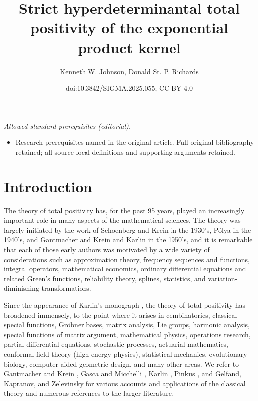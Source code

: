 \documentclass[10pt,a4paper]{amsart}
\title{Strict hyperdeterminantal total positivity of the exponential product kernel}
\author{Kenneth W. Johnson, Donald St. P. Richards}
\date{doi:10.3842/SIGMA.2025.055; CC BY 4.0}
\numberwithin{equation}{section}
\begin{document}
\maketitle
\noindent\textit{Allowed standard prerequisites (editorial).}\begin{itemize}
\item Research prerequisites named in the original article. Full original bibliography retained; all source-local definitions and supporting arguments retained.
\end{itemize}\medskip
\section{Introduction}\label{sec_intro}

The theory of total positivity has, for the past 95 years, played an increasingly important role in many aspects of the mathematical sciences. The theory was largely initiated by the work of Schoenberg \cite{Schoenberg} and Krein \cite{Krein} in the 1930's, P\'olya \cite{Polya} in the 1940's, and Gantmacher and Krein \cite{GantmacherKrein} and Karlin \cite{Karlin} in the 1950's, and it is remarkable that each of those early authors was motivated by a wide variety of considerations such as approximation theory, frequency sequences and functions, integral operators, mathematical economics, ordinary differential equations and related Green's functions, reliability theory, splines, statistics, and variation-diminishing transformations.

Since the appearance of Karlin's monograph \cite{Karlin}, the theory of total positivity has broadened immensely, to the point where it arises in combinatorics, classical special functions, Gr\"obner bases, matrix analysis, Lie groups, harmonic analysis, special functions of matrix argument, mathematical physics, operations research, partial differential equations, stochastic processes, actuarial mathematics, conformal field theory (high energy physics), statistical mechanics, evolutionary biology, computer-aided geometric design, and many other areas. We refer to Gantmacher and Krein \cite{GantmacherKrein}, Gasca and Micchelli \cite{GascaMicchelli}, Karlin \cite{Karlin,Karlin2}, Pinkus \cite{Pinkus}, and Gelfand, Kapranov, and Zelevinsky \cite{GKZ} for various accounts and applications of the classical theory and numerous references to the larger literature.
\end{document}
